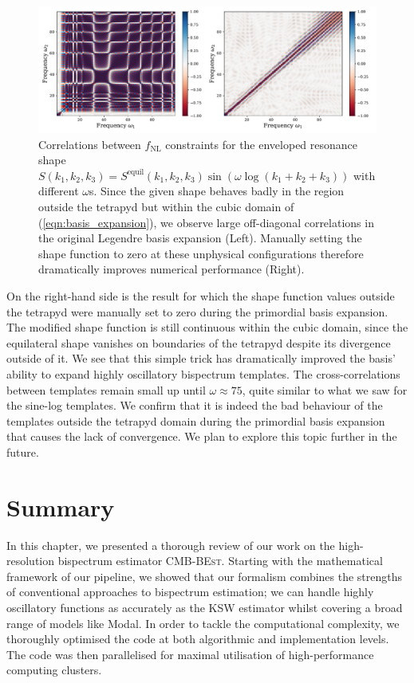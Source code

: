 \begin{figure}[htbp!] 
	\centering    
	\includegraphics[width=\textwidth]{sinlog_equil_template_correlations_compare_decomp.pdf}
	\caption{Correlations between $f_\text{NL}$ constraints for the enveloped resonance shape $S(k_1,k_2,k_3) = S^\text{equil}(k_1,k_2,k_3) \sin(\omega \log(k_1+k_2+k_3))$ with different $\omega$s. Since the given shape behaves badly in the region outside the tetrapyd but within the cubic domain of (\ref{eqn:basis_expansion}), we observe large off-diagonal correlations in the original Legendre basis expansion (Left). Manually setting the shape function to zero at these unphysical configurations therefore dramatically improves numerical performance (Right). }
	\label{fig:sinlog_equil_template_decomp_comparison}
\end{figure}

On the right-hand side is the result for which the shape function values outside the tetrapyd were manually set to zero during the primordial basis expansion. The modified shape function is still continuous within the cubic domain, since the equilateral shape vanishes on boundaries of the tetrapyd despite its divergence outside of it. We see that this simple trick has dramatically improved the basis' ability to expand highly oscillatory bispectrum templates. The cross-correlations between templates remain small up until $\omega\approx75$, quite similar to what we saw for the sine-log templates. We confirm that it is indeed the bad behaviour of the templates outside the tetrapyd domain during the primordial basis expansion that causes the lack of convergence. We plan to explore this topic further in the future.

\newpage
\section*{Summary}

In this chapter, we presented a thorough review of our work on the high-resolution bispectrum estimator \textsc{CMB-BEst}. Starting with the mathematical framework of our pipeline, we showed that our formalism combines the strengths of conventional approaches to bispectrum estimation; we can handle highly oscillatory functions as accurately as the KSW estimator whilst covering a broad range of models like Modal. In order to tackle the computational complexity, we thoroughly optimised the code at both algorithmic and implementation levels. The code was then parallelised for maximal utilisation of high-performance computing clusters.

